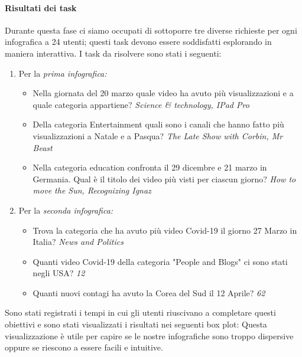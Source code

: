 \documentclass[10pt, a4paper,openany]{article}
\begin{document}
\paragraph{Risultati dei task} Durante questa fase ci siamo occupati di sottoporre tre diverse richieste per ogni infografica a 24 utenti; questi task devono essere soddisfatti esplorando in maniera interattiva. I task da risolvere sono stati i seguenti:
\begin{enumerate}
	\item Per la \textit{prima infografica:}
	\begin{itemize}
		\item Nella giornata del 20 marzo quale video ha avuto più visualizzazioni e a quale categoria appartiene?  \textit{Science \& technology, IPad Pro}
		\item Della categoria Entertainment quali sono i canali che hanno fatto più visualizzazioni a Natale e a Pasqua? \textit{The Late Show with Corbin, Mr Beast}
		\item Nella categoria education confronta il 29 dicembre e 21 marzo in Germania. Qual è il titolo dei video più visti per ciascun giorno? \textit{How to move the Sun, Recognizing Ignaz}
	\end{itemize}
	\item Per la \textit{seconda infografica:}
\begin{itemize}
	\item Trova la categoria che ha avuto più video Covid-19 il giorno 27 Marzo in Italia? \textit{News and Politics}
	\item Quanti video Covid-19 della categoria "People and Blogs" ci sono stati negli USA? \textit{12}
	\item Quanti nuovi contagi ha avuto la Corea del Sud il 12 Aprile? \textit{62}
\end{itemize}
\end{enumerate}

Sono stati registrati i tempi in cui gli utenti riuscivano a completare questi obiettivi e sono stati visualizzati i risultati nei seguenti box plot:
Questa visualizzazione è utile per capire se le nostre infografiche sono troppo dispersive oppure se riescono a essere facili e intuitive.
\end{document}
